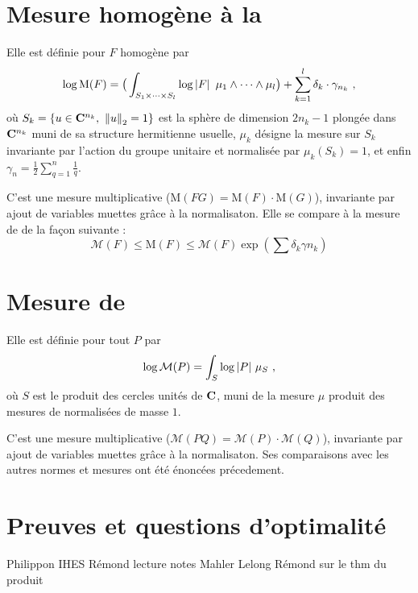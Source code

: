 \documentclass[11pt, twoside, a4paper]{article}
\newcommand*\normeuc[1]{\norm{#1}_2}
\newcommand*\mespph[1]{\mathrm{M}(#1)}
\newcommand*\mahler[1]{\mathcal{M}(#1)}
\begin{document}
	\section{Mesure homogène à la \texorpdfstring{}{Philippon}}

Elle est définie pour $F$ homogène par 
\[
 \log \mespph F = \big(\int_{S_{1}\times\cdots\times S_{l}} \log\abs F\ \mu_1 \wedge \cdots \wedge \mu_l\big) + \sum_{k=1}^l \delta_k \cdot \gamma_{n_k} \pmm,
\]
où $S_k = \{ u \in \C^{n_k},\ \normeuc u = 1 \}$ est la sphère de dimension $2n_k-1$ plongée dans $\mathbf{C}^{n_k}$ muni de sa structure hermitienne usuelle, $\mu_k$ désigne la mesure sur $S_k$ invariante par l'action du groupe unitaire et normalisée par $\mu_k(S_k) = 1$, et enfin $\gamma_n = \frac12 \sum_{q=1}^{n} \frac1q$. 

C'est une mesure multiplicative ($\mespph{FG} = \mespph F \cdot \mespph G$), invariante par ajout de variables muettes grâce à la normalisaton. 
Elle se compare à la mesure de  de la façon suivante :
\begin{equation}
 \mahler F \le \mespph F \le \mahler F \exp(\sum\delta_k\gamma{n_k})
\end{equation}

	\section{Mesure de \texorpdfstring{}{Mahler}}

Elle est définie pour tout $P$ par 
\[
 \log\mahler P = \int_S \log\abs P\, \mu_S \pmm,
\]
où $S$ est le produit des cercles unités de $\mathbf{C}$, muni de la mesure $\mu$ produit des mesures de  normalisées de masse $1$. 

C'est une mesure multiplicative ($\mahler{PQ} = \mahler P \cdot \mahler Q$), invariante par ajout de variables muettes grâce à la normalisaton. 
Ses comparaisons avec les autres normes et mesures ont été énoncées précedement.

	\section{Preuves et questions d'optimalité}


\begin{thebibliography}{9}
  Philippon IHES
  Rémond lecture notes
  Mahler
  Lelong
  Rémond sur le thm du produit
\end{thebibliography}
\end{document}
